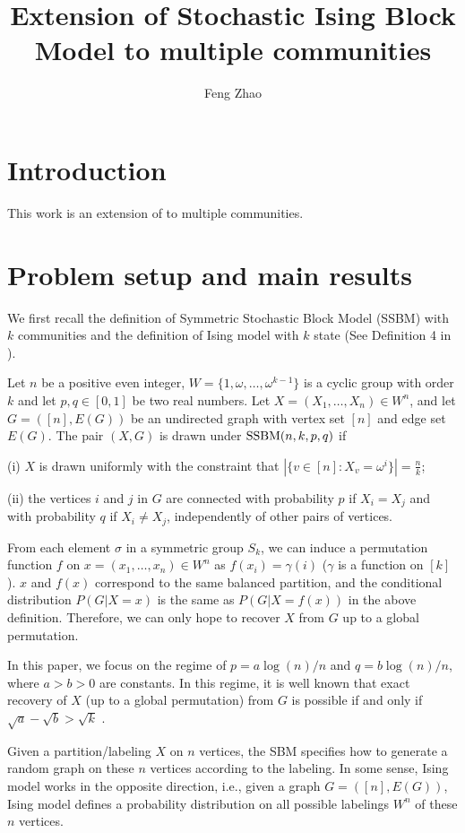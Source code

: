 \documentclass{article}
\title{Extension of Stochastic Ising Block Model to multiple communities}
\author{Feng Zhao}
\begin{document}
\maketitle
\section{Introduction}
This work is an extension of \cite{ye2020exact} to multiple communities.
\section{Problem setup and main results} \label{s:Preliminaries}
We first recall the definition of Symmetric Stochastic Block Model (SSBM) with $k$ communities and the definition of Ising model with $k$ state (See Definition 4 in \cite{Abbe17}).
\begin{definition} \label{def:SSBM}
Let $n$ be a positive even integer, $W= \{1, \omega, \dots, \omega^{k-1}\}$ is a cyclic group with order $k$ and let $p,q\in[0,1]$ be two real numbers. Let $X=(X_1,\dots,X_n)\in W^n$, and let $G=([n],E(G))$ be an undirected graph with vertex set $[n]$ and edge set $E(G)$. The pair $(X,G)$ is drawn under $\operatorname{SSBM}(n,k,p,q)$ if 

\noindent
(i) $X$ is drawn uniformly with the constraint that $|\{v \in [n] : X_v = \omega^i\}| = \frac{n}{k}$;

\noindent
(ii) the vertices $i$ and $j$ in $G$ are connected with probability $p$ if $X_i=X_j$ and with probability $q$ if $X_i \neq X_j$, independently of other pairs of vertices.
\end{definition}
 
From each element $\sigma$ in a symmetric group $S_k$, we can induce a permutation function $f$ on $x=(x_1,\dots,x_n)\in W^n$ as $f(x_i) = \gamma(i)$ ($\gamma$ is a function on $[k]$).
$x$ and $f(x)$ correspond to the same balanced partition, and the conditional distribution $P(G|X=x)$ is the same as $P(G|X=f(x))$ in the above definition. Therefore, we can only hope to recover $X$ from $G$ up to a global permutation.

In this paper, we focus on the regime of $p=a\log(n)/n$ and $q=b\log(n)/n$, where $a>b> 0$ are constants. In this regime, it is well known that exact recovery of $X$ (up to a global permutation) from $G$ is possible if and only if $\sqrt{a}-\sqrt{b} > \sqrt{k}$  \cite{abbe2015exact}.
 
Given a partition/labeling $X$ on $n$ vertices, the SBM specifies how to generate a random graph on these $n$ vertices according to the labeling. In some sense, Ising model works in the opposite direction, i.e., given a graph $G=([n],E(G))$, Ising model defines a probability distribution on all possible labelings $W^n$ of these $n$ vertices. 
\end{document}
